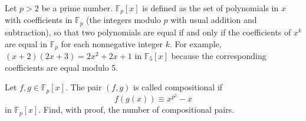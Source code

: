 Let $p > 2$ be a prime number. $\mathbb{F}_p[x]$ is defined as the set of polynomials in $x$ with coefficients in $\mathbb{F}_p$ (the integers modulo $p$ with usual addition and subtraction), so that two polynomials are equal if and only if the coefficients of $x^k$ are equal in $\mathbb{F}_p$ for each nonnegative integer $k$. For example, $(x+2)(2x+3) = 2x^2 + 2x + 1$ in $\mathbb{F}_5[x]$ because the corresponding coefficients are equal modulo 5.

Let $f, g \in \mathbb{F}_p[x]$. The pair $(f, g)$ is called compositional if\[f(g(x)) \equiv x^{p^2} - x\]in $\mathbb{F}_p[x]$. Find, with proof, the number of compositional pairs.